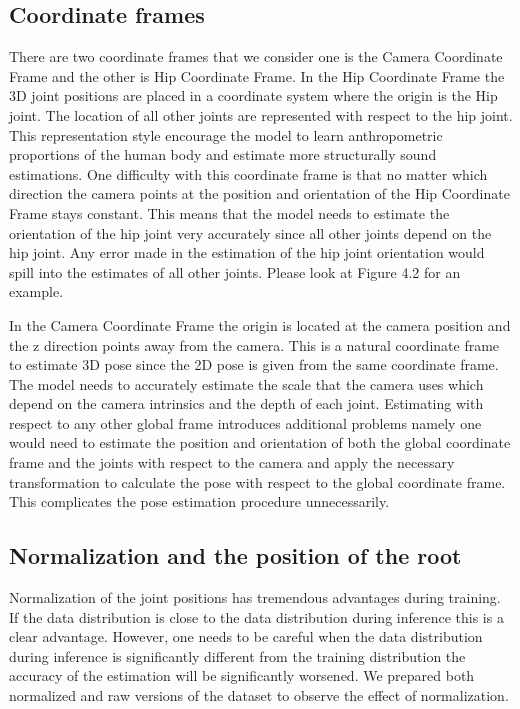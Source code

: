 \subsection{Coordinate frames}

There are two coordinate frames that we consider one is the Camera Coordinate Frame and the other is Hip Coordinate Frame. In the Hip Coordinate Frame the 3D joint positions are placed in a coordinate system where the origin is the Hip joint. The location of all other joints are represented with respect to the hip joint. This representation style encourage the model to learn anthropometric proportions of the human body and estimate more structurally sound estimations. One difficulty with this coordinate frame is that no matter which direction the camera points at the position and orientation of the Hip Coordinate Frame stays constant. This means that the model needs to estimate the orientation of the hip joint very accurately since all other joints depend on the hip joint. Any error made in the estimation of the hip joint orientation would spill into the estimates of all other joints. Please look at Figure 4.2 for an example.

In the Camera Coordinate Frame the origin is located at the camera position and the z direction points away from the camera. This is a natural coordinate frame to estimate 3D pose since the 2D pose is given from the same coordinate frame. The model needs to accurately estimate the scale that the camera uses which depend on the camera intrinsics and the depth of each joint. Estimating with respect to any other global frame introduces additional problems namely one would need to estimate the position and orientation of both the global coordinate frame and the joints with respect to the camera and apply the necessary transformation to calculate the pose with respect to the global coordinate frame. This complicates the pose estimation procedure unnecessarily.

\subsection{Normalization and the position of the root}

Normalization of the joint positions has tremendous advantages during training. If the data distribution is close to the data distribution during inference this is a clear advantage. However, one needs to be careful when the data distribution during inference is significantly different from the training distribution the accuracy of the estimation will be significantly worsened. We prepared both normalized and raw versions of the dataset to observe the effect of normalization.

